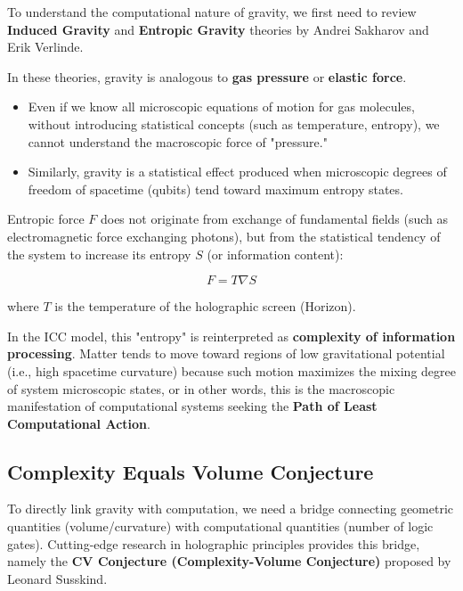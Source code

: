 To understand the computational nature of gravity, we first need to review \textbf{Induced Gravity} and \textbf{Entropic Gravity} theories by Andrei Sakharov and Erik Verlinde.

In these theories, gravity is analogous to \textbf{gas pressure} or \textbf{elastic force}.

\begin{itemize}
\item Even if we know all microscopic equations of motion for gas molecules, without introducing statistical concepts (such as temperature, entropy), we cannot understand the macroscopic force of "pressure."

\item Similarly, gravity is a statistical effect produced when microscopic degrees of freedom of spacetime (qubits) tend toward maximum entropy states.
\end{itemize}

\begin{definition}
Entropic force $F$ does not originate from exchange of fundamental fields (such as electromagnetic force exchanging photons), but from the statistical tendency of the system to increase its entropy $S$ (or information content):

\begin{equation}
F = T \nabla S
\end{equation}

where $T$ is the temperature of the holographic screen (Horizon).
\end{definition}

In the ICC model, this "entropy" is reinterpreted as \textbf{complexity of information processing}. Matter tends to move toward regions of low gravitational potential (i.e., high spacetime curvature) because such motion maximizes the mixing degree of system microscopic states, or in other words, this is the macroscopic manifestation of computational systems seeking the \textbf{Path of Least Computational Action}.

\subsection{Complexity Equals Volume Conjecture}

To directly link gravity with computation, we need a bridge connecting geometric quantities (volume/curvature) with computational quantities (number of logic gates). Cutting-edge research in holographic principles provides this bridge, namely the \textbf{CV Conjecture (Complexity-Volume Conjecture)} proposed by Leonard Susskind.

